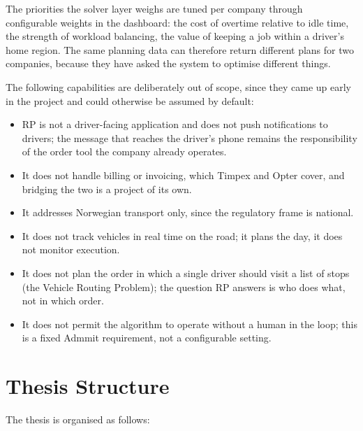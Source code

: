 The priorities the solver layer weighs are tuned per company through configurable weights in the dashboard: the cost of overtime relative to idle time, the strength of workload balancing, the value of keeping a job within a driver's home region. The same planning data can therefore return different plans for two companies, because they have asked the system to optimise different things.

The following capabilities are deliberately out of scope, since they came up early in the project and could otherwise be assumed by default:

\begin{itemize}
  \item RP is not a driver-facing application and does not push notifications to drivers; the message that reaches the driver's phone remains the responsibility of the order tool the company already operates.
  \item It does not handle billing or invoicing, which Timpex and Opter cover, and bridging the two is a project of its own.
  \item It addresses Norwegian transport only, since the regulatory frame is national.
  \item It does not track vehicles in real time on the road; it plans the day, it does not monitor execution.
  \item It does not plan the order in which a single driver should visit a list of stops (the Vehicle Routing Problem); the question RP answers is who does what, not in which order.
  \item It does not permit the algorithm to operate without a human in the loop; this is a fixed Admmit requirement, not a configurable setting.
\end{itemize}


\section{Thesis Structure}
\label{sec:thesis-structure}

The thesis is organised as follows:

